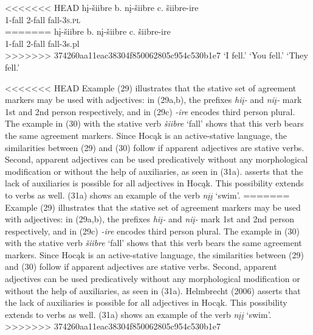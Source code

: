 \documentclass[output=paper]{LSP/langsci}
\begin{document}
\begin{exe}
\begin{exe}
\begin{exe}
\begin{exe}
{\begin{exe}
\begin{exe}
\ex
\begin{xlist}
\ex \gll
<<<<<<< HEAD
hį-šiibre \hspace{30pt}  b. {} nį-šiibre \hspace{43pt} c. {} šiibre-ire\\
1-fall {} {} {} 2-fall {} {} {} fall-\textsc{3s.pl}\\
=======
h\k{i}-\v{s}iibre \hspace{30pt}  b. {} n\k{i}-\v{s}iibre \hspace{43pt} c. {} \v{s}iibre-ire\\
1-fall {} {} {} 2-fall {} {} {} fall-{\textsc 3s.pl}\\
>>>>>>> 374260aa11eac38304f850062805c954c530b1e7
\glt `I fell.' \hspace{2cm} `You fell.'  \hspace{1.7cm} `They fell.'


\end{xlist}
\end{exe}

<<<<<<< HEAD
Example (29) illustrates that the stative set of agreement markers may be used with adjectives: in (29a,b), the prefixes \textit{hiį-} and \textit{niį-} mark 1st and 2nd person respectively, and in (29c) \textit{-ire} encodes third person plural. The example in (30) with the stative verb \textit{šiibre} `fall' shows that this verb bears the same agreement markers. Since Hocąk is an active-stative language, the similarities between (29) and (30) follow if apparent adjectives are stative verbs. Second, apparent adjectives can be used predicatively without any morphological modification or without the help of auxiliaries, as seen in (31a). \citet{Helmbrecht2006} asserts that the lack of auxiliaries is possible for all adjectives in Hocąk. This possibility extends to verbs as well. (31a) shows an example of the verb \textit{nįį} `swim'.
=======
Example (29) illustrates that the stative set of agreement markers may be used with adjectives: in (29a,b), the prefixes \textit{hi\k{i}-} and \textit{ni\k{i}-} mark 1st and 2nd person respectively, and in (29c) \textit{-ire} encodes third person plural. The example in (30) with the stative verb \textit{\v{s}iibre} `fall' shows that this verb bears the same agreement markers. Since Hoc\k{a}k is an active-stative language, the similarities between (29) and (30) follow if apparent adjectives are stative verbs. Second, apparent adjectives can be used predicatively without any morphological modification or without the help of auxiliaries, as seen in (31a). Helmbrecht (2006) asserts that the lack of auxiliaries is possible for all adjectives in Hoc\k{a}k. This possibility extends to verbs as well. (31a) shows an example of the verb \textit{n\k{i}\k{i}} `swim'.
>>>>>>> 374260aa11eac38304f850062805c954c530b1e7


\end{exe}}
\end{exe}
\end{exe}
\end{exe}
\end{exe}
\end{document}

